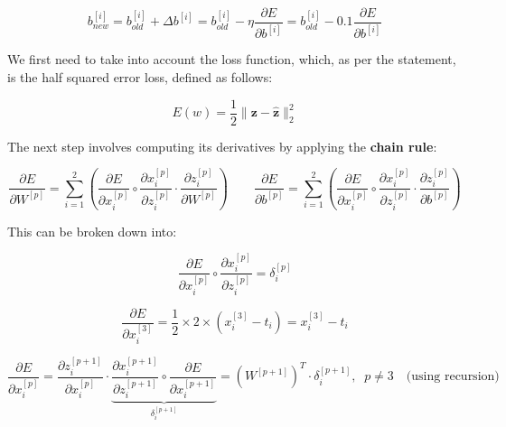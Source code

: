 \documentclass[12pt]{article}
\begin{document}
\begin{enumerate}[leftmargin=\labelsep]
        \begin{equation}\label{ex2-new-bias}
          b^{[i]}_{new} = b^{[i]}_{old} + \Delta b^{[i]} = b^{[i]}_{old} - \eta \frac{\partial E}{\partial b^{[i]}} = b^{[i]}_{old} - 0.1 \frac{\partial E}{\partial b^{[i]}}
        \end{equation}

        We first need to take into account the loss function, which, as per the statement, is the half squared error loss, defined as follows:

        \vskip -0.3cm
        \begin{equation*}
          E(w) = \frac{1}{2} \|\mathbf{z} - \hat{\mathbf{z}}\|^{2}_{2}
        \end{equation*}

        The next step involves computing its derivatives by applying the \textbf{chain rule}:

        \begin{equation*}
          \frac{\partial E}{\partial W^{[p]}} = \sum_{i=1}^{2} \left(\frac{\partial E}{\partial x^{[p]}_i} \circ
          \frac{\partial x^{[p]}_i}{\partial z^{[p]}_i} \cdot \frac{\partial z^{[p]}_i}{\partial W^{[p]}} \right)
          \qquad
          \frac{\partial E}{\partial b^{[p]}} = \sum_{i=1}^{2} \left(\frac{\partial E}{\partial x^{[p]}_i} \circ
          \frac{\partial x^{[p]}_i}{\partial z^{[p]}_i} \cdot \frac{\partial z^{[p]}_i}{\partial b^{[p]}} \right)
        \end{equation*}

        This can be broken down into:

        \vskip -0.3cm
        \begin{equation*}
          \frac{\partial E}{\partial x^{[p]}_i} \circ \frac{\partial x^{[p]}_i}{\partial z^{[p]}_i} = \delta^{[p]}_i
        \end{equation*}

        \begin{equation*}
          \frac{\partial E}{\partial x^{[3]}_i} = \frac{1}{2} \times 2 \times \left(x^{[3]}_i - t_i\right)
          = x^{[3]}_i - t_i
        \end{equation*}

        \begin{equation*}
          \frac{\partial E}{\partial x^{[p]}_i} = \frac{\partial z^{[p+1]}_i}{\partial x^{[p]}_i} \cdot
          \underbrace{\frac{\partial x^{[p+1]}_i}{\partial z^{[p+1]}_i} \circ \frac{\partial E}{\partial x^{[p+1]}_i}}_{\delta^{[p+1]}_i}
          = \left(W^{[p+1]}\right)^{T} \cdot \delta^{[p+1]}_i, \;\; p \neq 3 \quad \text{(using recursion)}
        \end{equation*}


\end{enumerate}
\end{document}
